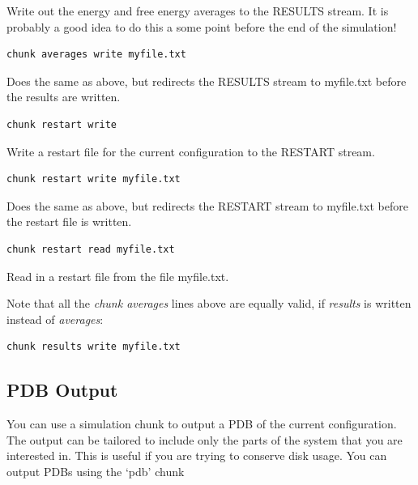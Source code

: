 \documentclass[letterpaper,10pt,english]{sphinxmanual}
\begin{document}
Write out the energy and free energy averages to the RESULTS stream. It is probably a good idea to do this a some point before the end of the simulation!

\begin{Verbatim}[frame=single,commandchars=\\\{\}]
chunk averages write myfile.txt
\end{Verbatim}

Does the same as above, but redirects the RESULTS stream to myfile.txt before the results are written.

\begin{Verbatim}[frame=single,commandchars=\\\{\}]
chunk restart write
\end{Verbatim}

Write a restart file for the current configuration to the RESTART stream.

\begin{Verbatim}[frame=single,commandchars=\\\{\}]
chunk restart write myfile.txt
\end{Verbatim}

Does the same as above, but redirects the RESTART stream to myfile.txt before the restart file is written.

\begin{Verbatim}[frame=single,commandchars=\\\{\}]
chunk restart read myfile.txt
\end{Verbatim}

Read in a restart file from the file myfile.txt.

Note that all the \emph{chunk averages} lines above are equally valid, if \emph{results} is written instead of \emph{averages}:

\begin{Verbatim}[frame=single,commandchars=\\\{\}]
chunk results write myfile.txt
\end{Verbatim}


\subsection{PDB Output}
\label{protoms:pdb-output}
You can use a simulation chunk to output a PDB of the current configuration. The output can be tailored to include only the parts of the system that you are interested in. This is useful if you are trying to conserve disk usage. You can output PDBs using the ‘pdb’ chunk
\end{document}
